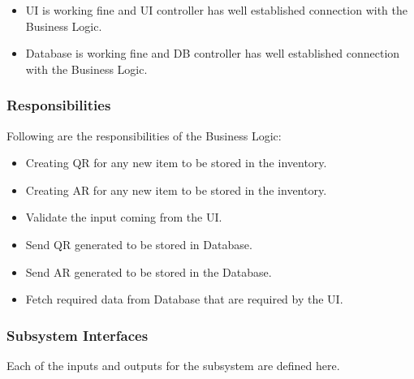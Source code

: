\begin{itemize}
    
    \item UI is working fine and UI controller has well established connection with the Business Logic.
    \item Database is working fine and DB controller has well established connection with the Business Logic.
\end{itemize}

\subsubsection{Responsibilities}
Following are the responsibilities of the Business Logic:
\begin{itemize}
    \item Creating QR for any new item to be stored in the inventory.
    \item Creating AR for any new item to be stored in the inventory.
    \item Validate the input coming from the UI.
    \item Send QR generated to be stored in Database.
    \item Send AR generated  to be stored in the Database.
    \item Fetch required data from Database that are required by the UI.
\end{itemize}


\subsubsection{Subsystem Interfaces}
Each of the inputs and outputs for the subsystem are defined here. 

